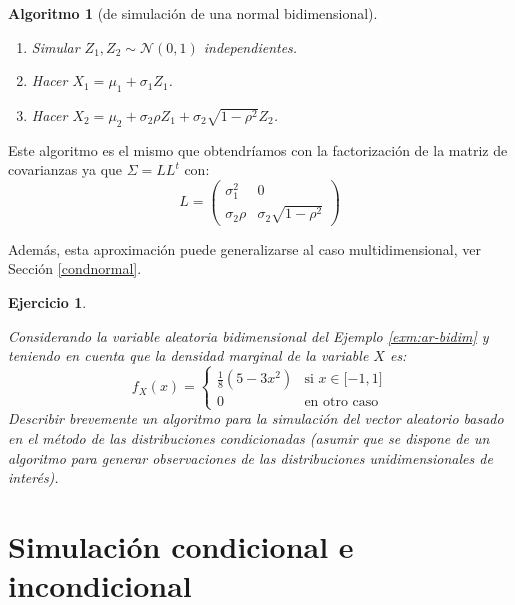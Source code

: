 \documentclass[
]{book}
\theoremstyle{break}
\newtheorem{conjecture}{Algoritmo}[chapter]
\newtheorem{exercise}{Ejercicio}[chapter]
\theoremstyle{nonumberplain}
\begin{document}
\begin{conjecture}[de simulación de una normal bidimensional]
\protect\hypertarget{cnj:norm-bidim-cond}{}\label{cnj:norm-bidim-cond}

\begin{enumerate}
\def\labelenumi{\arabic{enumi}.}
\item
  Simular \(Z_1, Z_2 \sim \mathcal{N}\left( 0, 1 \right)\) independientes.
\item
  Hacer \(X_1 = \mu_1 + \sigma_1 Z_1\).
\item
  Hacer \(X_2 =\mu_2 + \sigma_2 \rho Z_1 + \sigma_2 \sqrt{1-\rho^2} Z_2\).
\end{enumerate}

\end{conjecture}

Este algoritmo es el mismo que obtendríamos con la factorización de la matriz de covarianzas ya que \(\Sigma = L L^t\) con:
\[L = \begin{pmatrix}
 \sigma^2_1 &  0 \\
 \sigma_2 \rho &  \sigma_2  \sqrt{1-\rho^2}
\end{pmatrix}\]

Además, esta aproximación puede generalizarse al caso multidimensional, ver Sección \ref{condnormal}.

\begin{exercise}
\protect\hypertarget{exr:cond2d}{}\label{exr:cond2d}

Considerando la variable aleatoria bidimensional del Ejemplo \ref{exm:ar-bidim} y teniendo en cuenta que la densidad marginal de la variable \(X\) es:
\[f_{X}(x)=\left\{ 
\begin{array}{cl}
\frac{1}{8}\left( 5-3x^2\right)  & \text{si }x\in \lbrack -1,1] \\ 
0 & \text{en otro caso}
\end{array}
\right.\]
Describir brevemente un algoritmo para la simulación del vector aleatorio basado en el método de las distribuciones condicionadas (asumir que se dispone de un algoritmo para generar observaciones de las distribuciones unidimensionales de interés).
\end{exercise}

\hypertarget{simulaciuxf3n-condicional-e-incondicional}{%
\section{Simulación condicional e incondicional}\label{simulaciuxf3n-condicional-e-incondicional}}
\end{document}
